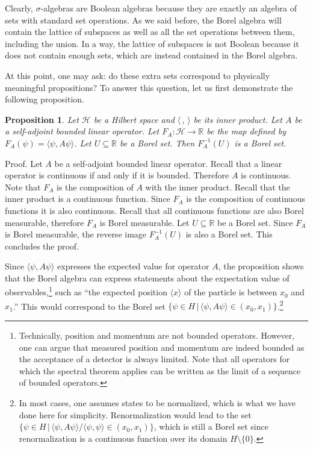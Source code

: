 \documentclass[11pt, executivepaper]{article}
\newtheorem{prop}{Proposition}
\begin{document}
Clearly, $\sigma$-algebras are Boolean algebras because they are exactly an algebra of sets with standard set operations. As we said before, the Borel algebra will contain the lattice of subspaces as well as all the set operations between them, including the union. In a way, the lattice of subspaces is not Boolean because it does not contain enough sets, which are instead contained in the Borel algebra.

At this point, one may ask: do these extra sets correspond to physically meaningful propositions? To answer this question, let us first demonstrate the following proposition.

\begin{prop}
	Let $\mathcal{H}$ be a Hilbert space and $\langle \, , \, \rangle$ be its inner product. Let $A$ be a self-adjoint bounded linear operator. Let $F_A : \mathcal{H} \to \mathbb{R}$ be the map defined by $F_A(\psi) = \langle \psi , A \psi \rangle$. Let $U \subseteq \mathbb{R}$ be a Borel set. Then $F_A^{-1}(U)$ is a Borel set.
\end{prop}

Proof. Let $A$ be a self-adjoint bounded linear operator. Recall that a linear operator is continuous if and only if it is bounded. Therefore $A$ is continuous. Note that $F_A$ is the composition of $A$ with the inner product. Recall that the inner product is a continuous function. Since $F_A$ is the composition of continuous functions it is also continuous. Recall that all continuous functions are also Borel measurable, therefore $F_A$ is Borel measurable. Let $U \subseteq \mathbb{R}$ be a Borel set. Since $F_A$ is Borel measurable, the reverse image $F_A^{-1}(U)$ is also a Borel set. This concludes the proof.

Since $\langle \psi , A \psi \rangle$ expresses the expected value for operator $A$, the proposition shows that the Borel algebra can express statements about the expectation value of observables,\footnote{Technically, position and momentum are not bounded operators. However, one can argue that measured position and momentum are indeed bounded as the acceptance of a detector is always limited. Note that all operators for which the spectral theorem applies can be written as the limit of a sequence of bounded operators.} such as ``the expected position $\langle x \rangle$ of the particle is between $x_0$ and $x_1$.'' This would correspond to the Borel set $\{ \psi \in H \, | \, \langle \psi , A \psi \rangle \in (x_0, x_1) \}$.\footnote{In most cases, one assumes states to be normalized, which is what we have done here for simplicity. Renormalization would lead to the set $\{ \psi \in H \, | \, \langle \psi , A \psi \rangle / \langle \psi , \psi \rangle \in (x_0, x_1) \}$, which is still a Borel set since renormalization is a continuous function over its domain $H \setminus \{ 0 \}$.}
\end{document}
